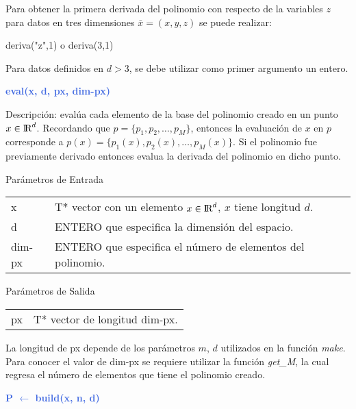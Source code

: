 \documentclass[a4paper,11pt]{article}
\newcommand \RR{\hbox{I\kern -.2em \hbox {R}}}
\begin{document}
{{Para obtener la primera derivada del polinomio con respecto de la variables $z$ para datos en tres dimensiones $\bar{x} = (x,y,z)$
se puede realizar:

\begin{center}
deriva("z",1) \hspace{1cm} o \hspace{1cm}  deriva(3,1)
\end{center}

Para datos definidos en $d>3$, se debe utilizar como primer argumento un entero.


\vspace{7mm}
\noindent
{\textcolor{RoyalBlue}{ \textbf{eval(x,  d,  px, dim-px)} }

\noindent
Descripci\'on: eval\'ua cada elemento de la base del polinomio creado en un punto $x \in \RR^d$.
Recordando que $p=\{p_1, p_2, \ldots, p_M\}$, entonces la evaluaci\'on de $x$ en $p$ corresponde a
$p(x)=\{p_1(x), p_2(x), \ldots, p_M(x)\}$.
Si el polinomio fue previamente derivado entonces evalua la derivada del polinomio en dicho punto. 

\noindent
Par\'ametros de Entrada

\begin{tabular}{ll}
    x   &  T* vector con un elemento $x \in \RR^d$, $x$ tiene longitud $d$. \\
    d   &  ENTERO que especifica la dimensi\'on del espacio. \\
dim-px  &  ENTERO que especifica el n\'umero de elementos del polinomio. 
\end{tabular}

\noindent
Par\'ametros de Salida

\begin{tabular}{ll}
   px \hspace{7mm}  &  T* vector de longitud dim-px.
\end{tabular}


\vspace{5mm}
\noindent
La longitud de px depende de los par\'ametros $m$, $d$ utilizados en la funci\'on \textit{make}.
Para conocer el valor de dim-px se requiere utilizar la funci\'on \textit{get\_M}, la cual
regresa el n\'umero de elementos que tiene el polinomio creado.

\vspace{7mm}
\noindent
{\textcolor{RoyalBlue}{ \textbf{ P $\leftarrow$ build(x, n, d)  } }

}}}}
\end{document}
